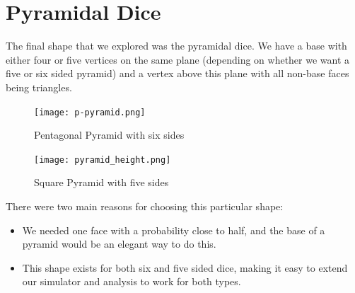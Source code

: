 \section{Pyramidal Dice}
The final shape that we explored was the pyramidal dice. We have a base with either four or five vertices on the same plane (depending on whether we want a five or six sided pyramid) and a vertex above this plane with all non-base faces being triangles.\\
\begin{figure}[h]
\center
\texttt{[image: p-pyramid.png]}
\caption{Pentagonal Pyramid with six sides}
\label{fig:pent_p}
\end{figure}

\begin{figure}[h]
\center
\texttt{[image: pyramid\_height.png]}
\caption{Square Pyramid with five sides}
\label{fig:square_py}
\end{figure}

There were two main reasons for choosing this particular shape:\\
\begin{itemize}
    \item We needed one face with a probability close to half, and the base of a pyramid would be an elegant way to do this.\\
    \item This shape exists for both six and five sided dice, making it easy to extend our simulator and analysis to work for both types.\\
\end{itemize}


